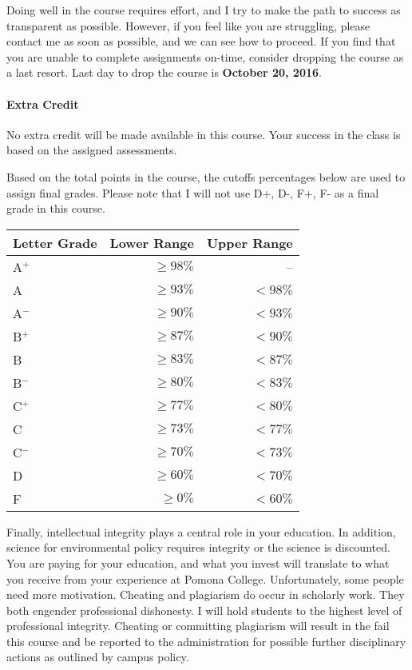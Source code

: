 Doing well in the course requires effort, and I try to make the path to success as transparent as possible. However, if you feel like you are struggling, please contact me as soon as possible, and we can see how to proceed. If you find that you are unable to complete assignments on-time, consider dropping the course as a last resort. Last day to drop the course is \textbf{October 20, 2016}. 

\paragraph{Extra Credit} No extra credit will be made available in this course. Your success in the class is based on the assigned assessments.

Based on the total points in the course, the cutoffs percentages below are used to assign final grades. Please note that I will not use D+, D-, F+, F- as a final grade in this course. 

\begin{table}[htbp]
	\centering
\begin{tabular}{lrr} \hline
Letter Grade & Lower Range & Upper Range \\ \hline\hline
A$^+$  &$ \geq98\%$ & --		 \\
A      & $\geq93\%$ & $<98\%$\\
A$^-$  & $\geq90\%$ & $<93\%$\\
B$^+$  & $\geq87\%$ & $<90\%$\\
B      & $\geq83\%$ & $<87\%$\\
B$^-$  & $\geq80\%$ & $<83\%$\\
C$^+$  & $\geq77\%$ & $<80\%$\\
C      & $\geq73\%$ & $<77\%$\\
C$^-$  & $\geq70\%$ & $<73\%$\\
D      & $\geq60\%$ & $<70\%$\\
F      & $\geq0\% $ & $<60\%$\\ \hline
		\end{tabular}
\end{table}

Finally, intellectual integrity plays a central role in your education. In addition, science for environmental policy requires integrity or the science is discounted. You are paying for your education, and what you invest will translate to what you receive from your experience at Pomona College. Unfortunately, some people need more motivation. Cheating and plagiarism do occur in scholarly work. They both engender professional dishonesty. I will hold students to the highest level of professional integrity. Cheating or committing plagiarism will result in the fail this course and be reported to the administration for possible further disciplinary actions as outlined by campus policy.


